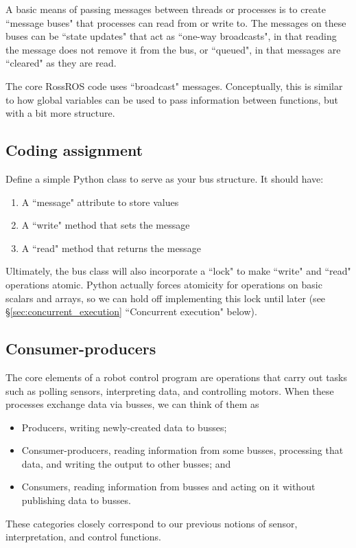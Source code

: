 \documentclass[11pt]{article}
\begin{document}
A basic means of passing messages between threads or processes is to create ``message buses" that processes can read from or write to. The messages on these buses can be ``state updates" that act as ``one-way broadcasts", in that reading the message does not remove it from the bus, or ``queued", in that messages are ``cleared" as they are read.

The core RossROS code uses ``broadcast" messages. Conceptually, this is similar to how global variables can be used to pass information between functions, but with a bit more structure.

\subsection*{Coding assignment}
Define a simple Python class to serve as your bus structure. It should have:
\begin{enumerate}
\item A ``message" attribute to store values
\item A ``write" method that sets the message
\item A ``read" method that returns the message
\end{enumerate}
Ultimately, the bus class will also incorporate a ``lock" to make ``write" and ``read" operations atomic. Python actually forces atomicity for operations on basic scalars and arrays, so we can hold off implementing this lock until later (see \S\ref{sec:concurrent_execution} ``Concurrent execution" below).

\subsection{Consumer-producers}

The core elements of a robot control program are operations that carry out tasks such as polling sensors, interpreting data, and controlling motors. When these processes exchange data via busses, we can think of them as 
\begin{itemize}
\item Producers, writing newly-created data to busses;
\item Consumer-producers, reading information from some busses, processing that data, and writing the output to other busses; and
\item Consumers, reading information from busses and acting on it without publishing data to busses.
\end{itemize}
These categories closely correspond to our previous notions of sensor, interpretation, and control functions.
\end{document}
